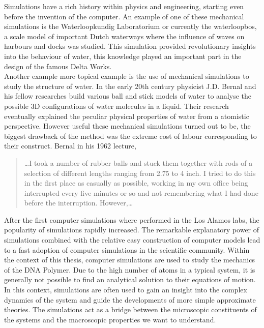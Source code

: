 Simulations have a rich history within physics and engineering, starting even before the
invention of the computer. An example of one of these mechanical simulations is the
 Waterloopkundig Laboratorium or currently the waterloopbos, a scale model of important
Dutch waterways where the influence of waves on harbours and docks was studied. This
simulation provided revolutionary insights into the behaviour of water, this knowledge
played an important part in the design of the famous Delta Works.\\
Another example more topical example is the use of mechanical simulations to study the
structure of water.  In the early 20th century physicist J.D. Bernal and his fellow
researches build various ball and stick models of water to analyse the possible 3D
configurations of water molecules in a liquid. Their research eventually explained the
peculiar physical properties of water from a atomistic perspective. However useful these
mechanical simulations turned out to be, the biggest drawback of the method was the
extreme cost of labour corresponding to their construct. Bernal in his 1962 lecture,

\begin{quote}
\dots I took a number of rubber balls and stuck them together with rods of a
selection of different lengths ranging from 2.75 to 4 inch. I tried to do this in the
first place as casually as possible, working in my own office being interrupted every
five minutes or so and not remembering what I had done before the interruption.
However,\dots
\end{quote}

After the first computer simulations where performed in the Los Alamos labs, the
popularity of simulations rapidly increased. The remarkable explanatory power of
simulations combined with the relative easy construction of computer models lead to a
fast adoption of computer simulations in the scientific community. Within the context of
this thesis, computer simulations are used to study the mechanics of
the DNA Polymer. Due to the high number of atoms in a typical system, it is generally
not possible to find an analytical solution to their equations of motion. In this
context, simulations are often used to gain an insight into the complex dynamics of the
system and guide the developments of more simple approximate theories. The simulations
act as a bridge between the microscopic constituents of the systems and the macroscopic
properties we want to understand.


